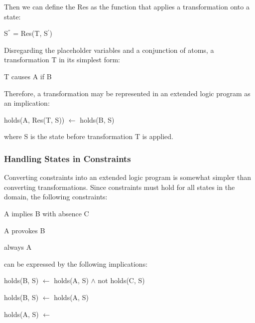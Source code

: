 \documentclass[a4paper]{article}
\begin{document}
        Then we can define the Res as the function that applies a 
        transformation onto a state:
  
        \begin{list}{}{}
          \item S$^{''}$ = Res(T, S$^{'}$)
        \end{list}
  
        Disregarding the placeholder variables and a conjunction of atoms, 
        a transformation T in its simplest form:
  
        \begin{list}{}{}
          \item T causes A if B
        \end{list}
  
        Therefore, a transformation may be represented in an extended logic
        program as an implication:
 
        \begin{list}{}{}
          \item holds(A, Res(T, S)) $\leftarrow$ holds(B, S)
        \end{list}

        where S is the state before transformation T is applied.

      \subsubsection{Handling States in Constraints}

        Converting constraints into an extended logic program is somewhat
        simpler than converting transformations. Since constraints must hold
        for all states in the domain, the following constraints:

      \begin{list}{}{}
        \item A implies B with absence C
        \item A provokes B
        \item always A
      \end{list}

        can be expressed by the following implications:

        \begin{list}{}{}
          \item 
            holds(B, S) $\leftarrow$ holds(A, S) $\land$ not holds(C, S)
          \item 
            holds(B, S) $\leftarrow$ holds(A, S)
          \item 
            holds(A, S) $\leftarrow$
        \end{list}
\end{document}
